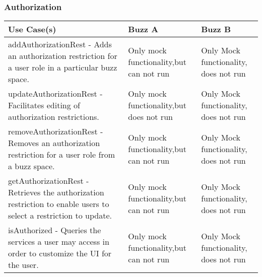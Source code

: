 \documentclass[12pt]{article}
\begin{document}
\subsubsection{Authorization}%
\begin{tabular}{|p{4.5cm}|p{4.5cm}|p{4.5cm}|}

\hline
Use Case(s) & Buzz A & Buzz B \\ 
\hline
addAuthorizationRest - Adds an authorization restriction for a user role in a particular buzz space. & Only mock functionality,but can not run & Only Mock functionality, does not run\\ %
\hline
updateAuthorizationRest - Facilitates editing of authorization restrictions. & Only mock functionality,but does not run & Only Mock functionality, does not run\\ %
\hline
removeAuthorizationRest - Removes an authorization restriction for a user role from a buzz space. & Only mock functionality,but can not run & Only Mock functionality, does not run\\ %
\hline
getAuthorizationRest - Retrieves the authorization restriction to enable users to select a restriction to update. & Only mock functionality,but can not run & Only Mock functionality, does not run\\ %
\hline
isAuthorized - Queries the services a user may access in order to customize the UI for the user. & Only mock functionality,but can not run & Only Mock functionality, does not run\\ %
\hline

\end{tabular}
\end{document}
